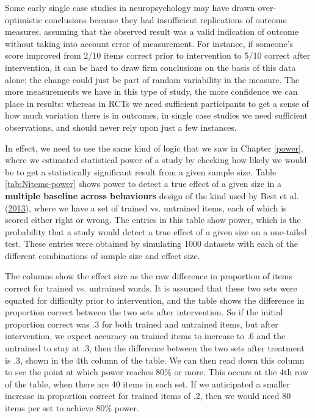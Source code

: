\documentclass{krantz}
\begin{document}
Some early single case studies in neuropsychology may have drawn over-optimistic conclusions because they had insufficient replications of outcome measures, assuming that the observed result was a valid indication of outcome without taking into account error of measurement. For instance, if someone's score improved from 2/10 items correct prior to intervention to 5/10 correct after intervention, it can be hard to draw firm conclusions on the basis of this data alone: the change could just be part of random variability in the measure. The more measurements we have in this type of study, the more confidence we can place in results: whereas in RCTs we need sufficient participants to get a sense of how much variation there is in outcomes, in single case studies we need sufficient observations, and should never rely upon just a few instances.

In effect, we need to use the same kind of logic that we saw in Chapter \ref{power}, where we estimated statistical power of a study by checking how likely we would be to get a statistically significant result from a given sample size. Table \ref{tab:Nitems-power} shows power to detect a true effect of a given size in a \textbf{multiple baseline across behaviours} design of the kind used by Best et al. (\protect\hyperlink{ref-best2013}{2013}), where we have a set of trained vs. untrained items, each of which is scored either right or wrong. The entries in this table show power, which is the probability that a study would detect a true effect of a given size on a one-tailed test. These entries were obtained by simulating 1000 datasets with each of the different combinations of sample size and effect size.

The columns show the effect size as the raw difference in proportion of items correct for trained vs. untrained words. It is assumed that these two sets were equated for difficulty prior to intervention, and the table shows the difference in proportion correct between the two sets after intervention. So if the initial proportion correct was .3 for both trained and untrained items, but after intervention, we expect accuracy on trained items to increase to .6 and the untrained to stay at .3, then the difference between the two sets after treatment is .3, shown in the 4th column of the table. We can then read down this column to see the point at which power reaches 80\% or more. This occurs at the 4th row of the table, when there are 40 items in each set. If we anticipated a smaller increase in proportion correct for trained items of .2, then we would need 80 items per set to achieve 80\% power.
\end{document}
